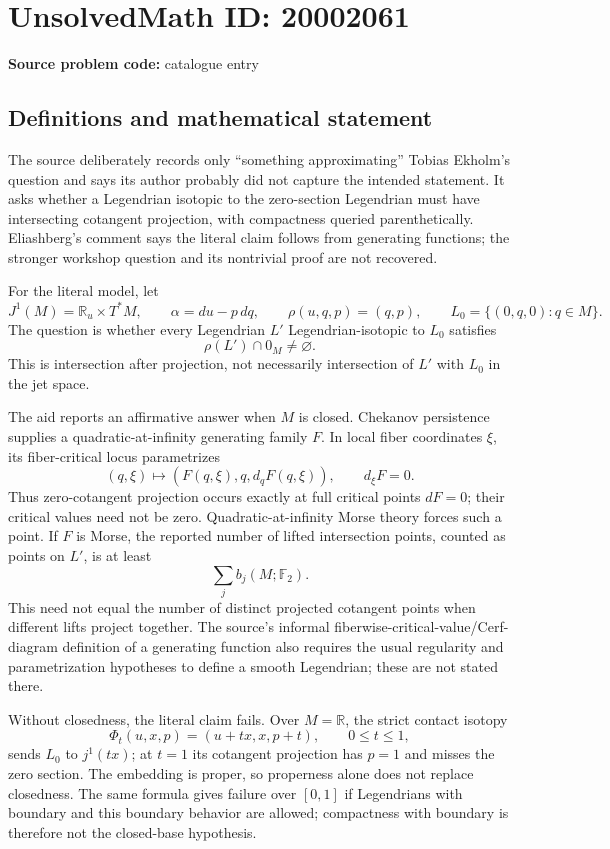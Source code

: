 \documentclass[11pt]{article}
\begin{document}
\section*{UnsolvedMath ID: 20002061}
\textbf{Source problem code:} catalogue entry
\subsection{Definitions and mathematical statement}
The source deliberately records only ``something approximating'' Tobias Ekholm's question and says its author probably did not capture the intended statement. It asks whether a Legendrian isotopic to the zero-section Legendrian must have intersecting cotangent projection, with compactness queried parenthetically. Eliashberg's comment says the literal claim follows from generating functions; the stronger workshop question and its nontrivial proof are not recovered.

For the literal model, let
\[
 J^1(M)=\mathbb R_u\times T^*M,\qquad
 \alpha=du-p\,dq,\qquad
 \rho(u,q,p)=(q,p),\qquad
 L_0=\{(0,q,0):q\in M\}.
\]
The question is whether every Legendrian \(L'\) Legendrian-isotopic to \(L_0\) satisfies
\[
 \rho(L')\cap0_M\ne\varnothing.
\]
This is intersection after projection, not necessarily intersection of \(L'\) with \(L_0\) in the jet space.

The aid reports an affirmative answer when \(M\) is closed. Chekanov persistence supplies a quadratic-at-infinity generating family \(F\). In local fiber coordinates \(\xi\), its fiber-critical locus parametrizes
\[
 (q,\xi)\longmapsto(F(q,\xi),q,d_qF(q,\xi)),
 \qquad d_\xi F=0.
\]
Thus zero-cotangent projection occurs exactly at full critical points \(dF=0\); their critical values need not be zero. Quadratic-at-infinity Morse theory forces such a point. If \(F\) is Morse, the reported number of lifted intersection points, counted as points on \(L'\), is at least
\[
 \sum_j b_j(M;\mathbb F_2).
\]
This need not equal the number of distinct projected cotangent points when different lifts project together. The source's informal fiberwise-critical-value/Cerf-diagram definition of a generating function also requires the usual regularity and parametrization hypotheses to define a smooth Legendrian; these are not stated there.

Without closedness, the literal claim fails. Over \(M=\mathbb R\), the strict contact isotopy
\[
 \Phi_t(u,x,p)=(u+tx,x,p+t),\qquad0\leq t\leq1,
\]
sends \(L_0\) to \(j^1(tx)\); at \(t=1\) its cotangent projection has \(p=1\) and misses the zero section. The embedding is proper, so properness alone does not replace closedness. The same formula gives failure over \([0,1]\) if Legendrians with boundary and this boundary behavior are allowed; compactness with boundary is therefore not the closed-base hypothesis.
\end{document}
